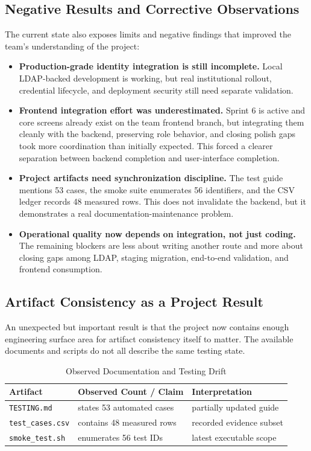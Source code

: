\documentclass[conference]{IEEEtran}
\begin{document}
\subsection{Negative Results and Corrective Observations}
The current state also exposes limits and negative findings that improved the team's understanding of the project:
\begin{itemize}
    \item \textbf{Production-grade identity integration is still incomplete.} Local LDAP-backed development is working, but real institutional rollout, credential lifecycle, and deployment security still need separate validation.
    \item \textbf{Frontend integration effort was underestimated.} Sprint 6 is active and core screens already exist on the team frontend branch, but integrating them cleanly with the backend, preserving role behavior, and closing polish gaps took more coordination than initially expected. This forced a clearer separation between backend completion and user-interface completion.
    \item \textbf{Project artifacts need synchronization discipline.} The test guide mentions 53 cases, the smoke suite enumerates 56 identifiers, and the CSV ledger records 48 measured rows. This does not invalidate the backend, but it demonstrates a real documentation-maintenance problem.
    \item \textbf{Operational quality now depends on integration, not just coding.} The remaining blockers are less about writing another route and more about closing gaps among LDAP, staging migration, end-to-end validation, and frontend consumption.
\end{itemize}

\subsection{Artifact Consistency as a Project Result}
An unexpected but important result is that the project now contains enough engineering surface area for artifact consistency itself to matter. The available documents and scripts do not all describe the same testing state.

\begin{table}[!t]
\centering
\caption{Observed Documentation and Testing Drift}
\begin{tabular}{|p{2.55cm}|p{3.45cm}|p{1.45cm}|}
\hline
\textbf{Artifact} & \textbf{Observed Count / Claim} & \textbf{Interpretation} \\
\hline
\texttt{TESTING.md} & states 53 automated cases & partially updated guide \\
\hline
\texttt{test\_cases.csv} & contains 48 measured rows & recorded evidence subset \\
\hline
\texttt{smoke\_test.sh} & enumerates 56 test IDs & latest executable scope \\
\hline
\end{tabular}
\label{tab:drift}
\end{table}
\end{document}
